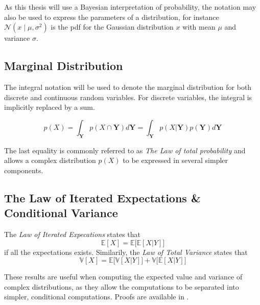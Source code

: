As this thesis will use a Bayesian interpretation of probability, the notation may also be used to express the parameters of a distribution, for instance $\mathcal{N}(x \; | \;\mu, \sigma^2)$ is the \acrshort{pdf}  for the Gaussian distribution $x$ with mean $\mu$ and variance $\sigma$.

\subsection{Marginal Distribution}
The integral notation will be used to denote the marginal distribution for both discrete and continuous random variables. For discrete variables, the integral is implicitly replaced by a sum.  

\begin{equation}
    p(X) = \int_{\boldsymbol{Y}} p(X \cap \boldsymbol{Y}) d\boldsymbol{Y} = \int_{\boldsymbol{Y}} p(X | \boldsymbol{Y}) p(\boldsymbol{Y}) d\boldsymbol{Y}
\end{equation}

The last equality is commonly referred to as \textit{The Law of total probability} and allows a complex distribution $p(X)$ to be expressed in several simpler components.

\subsection{The Law of Iterated Expectations \& Conditional Variance}

The \textit{Law of Iterated Expecations} states that 
\begin{equation}
    \mathbb{E}[X] = \mathbb{E} \big[ \mathbb{E}[ X | Y] \big]
\end{equation} if all the expectations exists. Similarily, the \textit{Law of Total Variance} states that 
\begin{equation}
    \mathbb{V}[X] = \mathbb{E}\big[\mathbb{V}[X | Y]\big] + \mathbb{V}\big[ \mathbb{E}[X | Y] \big]
\end{equation}

These results are useful when computing the expected value and variance of complex distributions, as they allow the computations to be separated into simpler, conditional computations. Proofs are available in \cite{aronow_miller_2019}.

